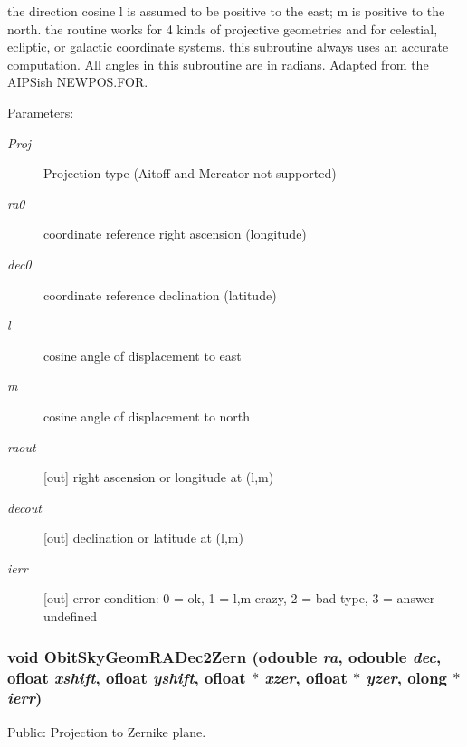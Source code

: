 the direction cosine l is assumed to be positive to the east; m is positive to the north. the routine works for 4 kinds of projective geometries and for celestial, ecliptic, or galactic coordinate systems. this subroutine always uses an accurate computation. All angles in this subroutine are in radians. Adapted from the AIPSish NEWPOS.FOR. \begin{Desc}
\item[Parameters:]
\begin{description}
\item[{\em Proj}]Projection type (Aitoff and Mercator not supported) \item[{\em ra0}]coordinate reference right ascension (longitude) \item[{\em dec0}]coordinate reference declination (latitude) \item[{\em l}]cosine angle of displacement to east \item[{\em m}]cosine angle of displacement to north \item[{\em raout}][out] right ascension or longitude at (l,m) \item[{\em decout}][out] declination or latitude at (l,m) \item[{\em ierr}][out] error condition: 0 = ok, 1 = l,m crazy, 2 = bad type, 3 = answer undefined \end{description}
\end{Desc}
\subsubsection{\setlength{\rightskip}{0pt plus 5cm}void Obit\-Sky\-Geom\-RADec2Zern ({\bf odouble} {\em ra}, {\bf odouble} {\em dec}, {\bf ofloat} {\em xshift}, {\bf ofloat} {\em yshift}, {\bf ofloat} $\ast$ {\em xzer}, {\bf ofloat} $\ast$ {\em yzer}, {\bf olong} $\ast$ {\em ierr})}\label{ObitSkyGeom_8h_a25}


Public: Projection to Zernike plane. 

